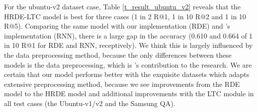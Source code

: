 \documentclass[11pt,a4paper]{article}
\begin{document}
For the ubuntu-v2 dataset case, Table \ref{t_result_ubuntu_v2} reveals that the HRDE-LTC model is best for three cases (1 in 2 R@1, 1 in 10 R@2 and  1 in 10 R@5).
Comparing the same model with our implementation (RDE) and \cite{baudivs2016sentence}'s implementation (RNN), there is a large gap in the accuracy (0.610 and 0.664 of 1 in 10 R@1 for RDE and RNN, receptively). We think this is largely influenced by the data preprocessing method, because the only differences between these models is the data preprocessing, which is \cite{baudivs2016sentence}'s contribution to the research. 
We are certain that our model performs better with the exquisite datasets which adapts extensive preprocessing method, because we see improvements from the RDE model to the HRDE model and additional improvements with the LTC module in all test cases (the Ubuntu-v1/v2 and the Samsung QA).
\end{document}
